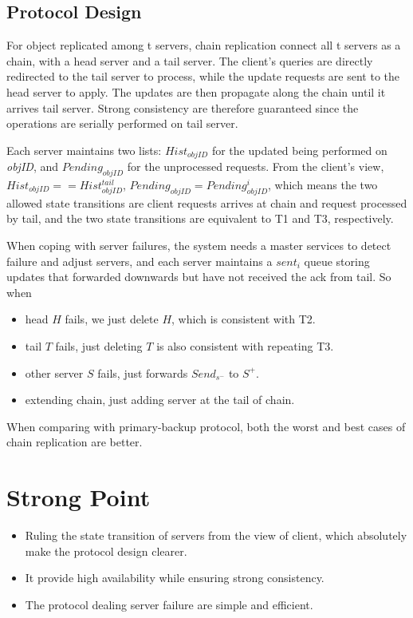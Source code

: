 \documentclass[conference]{IEEEtran}
\begin{document}
\subsection{Protocol Design}
For object replicated among t servers, chain replication connect all t servers as a chain, with a head server and a tail server. The client's queries are directly redirected to the tail server to process, while the update requests are sent to the head server to apply. The updates are then propagate along the chain until it arrives tail server. Strong consistency are therefore guaranteed since the operations are serially performed on tail server.

Each server maintains two lists: $Hist_{objID}$ for the updated being performed on \textit{objID}, and $Pending_{objID}$ for the unprocessed requests. From the client's view, $Hist_{objID} == Hist^{tail}_{objID}$, $Pending_{objID} = Pending^i_{objID}$, which means the two allowed state transitions are client requests arrives at chain and request processed by tail, and the two state transitions are equivalent to T1 and T3, respectively.

When coping with server failures, the system needs a master services to detect failure and adjust servers, and each server maintains a $sent_i$ queue storing updates that forwarded downwards but have not received the ack from tail. 
So when 
\begin{itemize}
    \item head $H$ fails, we just delete $H$, which is consistent with T2.
    \item tail $T$ fails, just deleting $T$ is also consistent with repeating T3. 
    \item other server $S$ fails, just forwards $Send_{s^-}$ to $S^+$.
    \item extending chain, just adding server at the tail of chain.
\end{itemize}

When comparing with primary-backup protocol, both the worst and best cases of chain replication are better.

\section{Strong Point}
\begin{itemize}
    \item Ruling the state transition of servers from the view of client, which absolutely make the protocol design clearer.
    \item It provide high availability while ensuring strong consistency.
    \item The protocol dealing server failure are simple and efficient.
\end{itemize}
\end{document}
